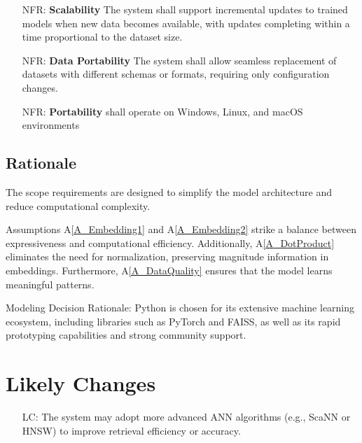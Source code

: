 \documentclass[12pt]{article}
\newcommand{\aref}[1]{A\ref{#1}}
\newcounter{nfrnum} %
\newcounter{lcnum} %
\begin{document}
\noindent \begin{itemize}

\item[NFR\refstepcounter{nfrnum}\thenfrnum \label{NFR_Scalability}:]
  \textbf{Scalability} The system shall support incremental updates to trained models when new data becomes available, with updates completing within a time proportional to the dataset size.

\item[NFR\refstepcounter{nfrnum}\thenfrnum \label{NFR_DataPortability}:]
  \textbf{Data Portability} The system shall allow seamless replacement of datasets with different schemas or formats, requiring only configuration changes.

\item[NFR\refstepcounter{nfrnum}\thenfrnum \label{NFR_Portability}:]
  \textbf{Portability} \progname{} shall operate on Windows, Linux, and macOS environments

\end{itemize}

\subsection{Rationale}

The scope requirements are designed to simplify the model architecture and reduce computational complexity.

Assumptions \aref{A_Embedding1} and \aref{A_Embedding2} strike a balance between expressiveness and computational efficiency. Additionally, \aref{A_DotProduct} eliminates the need for normalization, preserving magnitude information in embeddings. Furthermore, \aref{A_DataQuality} ensures that the model learns meaningful patterns.

Modeling Decision Rationale: 
Python is chosen for its extensive machine learning ecosystem, including libraries such as PyTorch and FAISS, as well as its rapid prototyping capabilities and strong community support.

\section{Likely Changes}    

\noindent \begin{itemize}

\item[LC\refstepcounter{lcnum}\thelcnum\label{LC_advancedANN}:] The system may adopt more advanced ANN algorithms (e.g., ScaNN or HNSW) to improve retrieval efficiency or accuracy.

\end{itemize}
\end{document}
